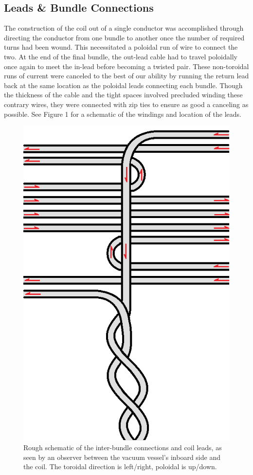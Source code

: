 \subsection{Leads \& Bundle Connections} 
The construction of the coil out of a single conductor was accomplished through directing the conductor from one bundle to another once the number of required turns had been wound.  This necessitated a poloidal run of wire to connect the two.  At the end of the final bundle, the out-lead cable had to travel poloidally once again to meet the in-lead before becoming a twisted pair.  These non-toroidal runs of current were canceled to the best of our ability by running the return lead back at the same location as the poloidal leads connecting each bundle.  Though the thickness of the cable and the tight spaces involved precluded winding these contrary wires, they were connected with zip ties to ensure as good a canceling as possible.  See Figure 1 for a schematic of the windings and location of the leads.\\
\begin{figure}
\includegraphics[width = \textwidth]{./figures/Coil_winding_schematic.png}\begin{flushleft}
\caption{Rough schematic of the inter-bundle connections and coil leads, as seen by an observer between the vacuum vessel's inboard side and the coil.  The toroidal direction is left/right, poloidal is up/down.}
\end{flushleft}
\label{raw_sig}
\end{figure}
